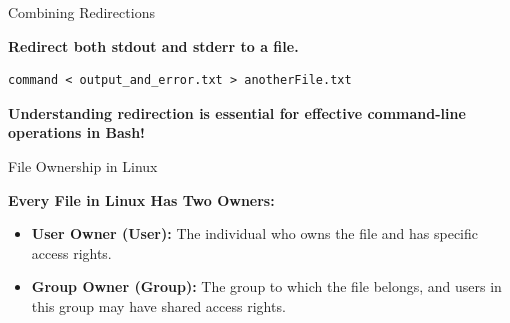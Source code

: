 \documentclass{beamer}
\begin{document}
\begin{frame}[fragile]{Combining Redirections}

  \textbf{Redirect both stdout and stderr to a file.}

  \begin{lstlisting}[frame=none]
  command < output_and_error.txt > anotherFile.txt
  \end{lstlisting}

  \textbf{Understanding redirection is essential for effective command-line operations in Bash!}

\end{frame}
%
%
%
%
%
%
%

\begin{frame}{File Ownership in Linux}

  \textbf{Every File in Linux Has Two Owners:}

  \begin{itemize}
    \item \textbf{User Owner (User):} The individual who owns the file and has specific access rights.
    \item \textbf{Group Owner (Group):} The group to which the file belongs, and users in this group may have shared access rights.
  \end{itemize}

\end{frame}
\end{document}

